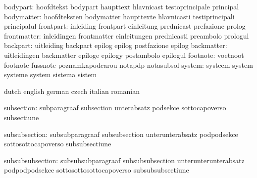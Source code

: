                  bodypart: hoofdtekst                bodypart
                           haupttext                 hlavnicast
                           testoprincipale           principal %
               bodymatter: hoofdteksten              bodymatter
                           haupttexte                hlavnicasti
                           testiprincipali           principalul %
                frontpart: inleiding                 frontpart
                           einleitung                prednicast
                           prefazione                prolog
              frontmatter: inleidingen               frontmatter
                           einleitungen              prednicasti
                           preambolo                 prologul
                 backpart: uitleiding                backpart
                           epilog                    epilog
                           postfazione               epilog %
               backmatter: uitleidingen              backmatter
                           epiloge                   epilogy
                           postambolo                epilogul %
                 footnote: voetnoot                  footnote
                           fussnote                  poznamkapodcarou
                           notapdp                   notasubsol
                   system: systeem                   system
                           systeme                   system
                           sistema                   sistem

\stopvariables


\startvariables         dutch                                    english
                        german                                   czech
                        italian                                  romanian

            subsection: subparagraaf                             subsection
                        unterabsatz                              podsekce
                        sottocapoverso                           subsectiune

         subsubsection: subsubparagraaf                          subsubsection
                        unterunterabsatz                         podpodsekce
                        sottosottocapoverso                      subsubsectiune

      subsubsubsection: subsubsubparagraaf                       subsubsubsection
                        unterunterunterabsatz                    podpodpodsekce
                        sottosottosottocapoverso                 subsubsubsectiune

